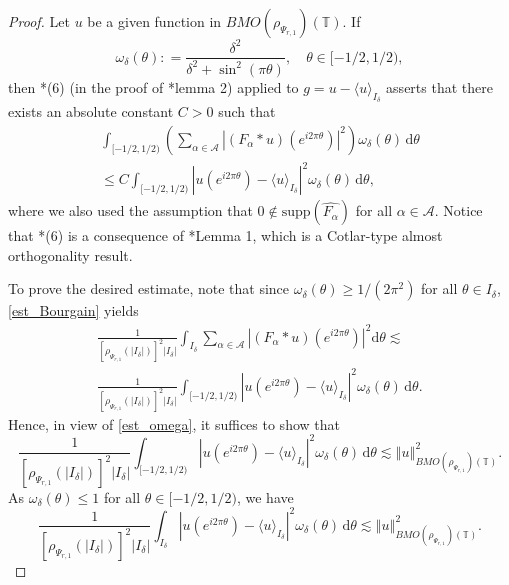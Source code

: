 \documentclass[a4paper, leqno, 10pt]{amsart}
\numberwithin{equation}{section}
\newcommand{\dd}{\mathrm{d}}
\newcommand{\T}{\mathbb{T}}
\newcommand{\norm}[1]{\left\Vert#1\right\Vert}
\begin{document}
\begin{proof} Let $u$ be a given function in $ BMO (\rho_{\Psi_{r,1}}) (\T)$. If
\[
\omega_{\delta} ( \theta) : = \frac{\delta^2}{\delta^2 + \sin^2 ( \pi \theta )}, \quad \theta \in [-1/2,1/2),
\]
then \cite{B_SF}*{(6)} (in the proof of \cite{B_SF}*{lemma 2}) applied to $g= u - \langle u \rangle_{I_{\delta}}$ asserts that there exists an absolute constant $C>0$ such that
\begin{multline}\label{est_Bourgain}
\int_{[-1/2,1/2)} \left( \sum_{\alpha \in \mathcal{A}} \left| ( F_{\alpha} \ast u) (e^{i 2 \pi \theta}) \right|^2 \right) \omega_{\delta} ( \theta )\, \dd \theta \\ \leq
C \int_{[-1/2,1/2)} | u ( e^{i 2 \pi \theta} ) - \langle u \rangle_{I_{\delta}} |^2 \omega_{\delta} ( \theta) \, \dd \theta ,
\end{multline}
where we also used the assumption that $0 \notin \mathrm{supp} (\widehat{F_{\alpha}})$ for all $\alpha \in \mathcal{A}$. Notice that \cite{B_SF}*{(6)} is a consequence of \cite{B_SF}*{Lemma 1}, which is a Cotlar-type almost orthogonality result. 

To prove the desired estimate, note that since $\omega_{\delta} ( \theta) \geq 1/( 2 \pi^2 ) $ for all $\theta \in I_{\delta}$, \eqref{est_Bourgain} yields
\begin{multline}\label{est_omega}
\frac{1} { \left[ \rho_{\Psi_{r,1}} (|I_{\delta}|) \right]^2 |I_{\delta}|} \int_{I_{\delta}} \sum_{\alpha \in \mathcal{A}} \left| ( F_{\alpha} \ast u) (e^{i 2 \pi \theta}) \right|^2 \dd \theta \lesssim \\ 
\frac{1} { \left[ \rho_{\Psi_{r,1}} (|I_{\delta}|) \right]^2 |I_{\delta}|}  \int_{[-1/2,1/2)} | u ( e^{i 2 \pi \theta} ) - \langle u \rangle_{I_{\delta}} |^2 \omega_{\delta} ( \theta ) \, \dd \theta .
\end{multline}
Hence, in view of \eqref{est_omega}, it suffices to show that
%
\begin{equation}
\label{u_omega_est}
\frac{1} { \left[ \rho_{\Psi_{r,1}} (|I_{\delta}|) \right]^2 |I_{\delta}|} \int_{[-1/2,1/2)} | u ( e^{i 2 \pi \theta} ) - \langle u \rangle_{I_{\delta}} |^2 \omega_{\delta} ( \theta ) \, \dd \theta  \lesssim %
\norm{ u }^2_{BMO (\rho_{\Psi_{r,1}}) (\T)}. 
\end{equation}
%
As $\omega_{\delta} (\theta) \leq 1 $ for all $\theta \in [-1/2,1/2)$, we have
\begin{equation}\label{I_u_omega_est}
\frac{1} { \left[ \rho_{\Psi_{r,1}} (|I_{\delta}|) \right]^2 |I_{\delta}|} \int_{I_{\delta}} | u (e^{i 2 \pi \theta}) - \langle u \rangle_{I_{\delta}} |^2 \omega_{\delta} ( \theta ) \, \dd \theta \lesssim \norm{ u }^2_{BMO (\rho_{\Psi_{r,1}}) (\T)} .
\end{equation}


\end{proof}
\end{document}
